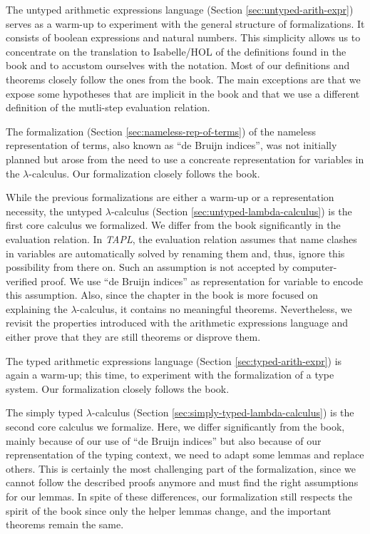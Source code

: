 The untyped arithmetic expressions language (Section \ref{sec:untyped-arith-expr}) serves as a
warm-up to experiment with the general structure of formalizations. It consists of boolean
expressions and natural numbers. This simplicity allows us to concentrate on the translation to
Isabelle/HOL of the definitions found in the book and to accustom ourselves with the notation. Most
of our definitions and theorems closely follow the ones from the book. The main exceptions are
that we expose some hypotheses that are implicit in the book and that we use a different definition
of the mutli-step evaluation relation.

The formalization (Section \ref{sec:nameless-rep-of-terms}) of the nameless representation of terms,
also known as ``de Bruijn indices'', was not initially planned but arose from the need to use a
concreate representation for variables in the $\lambda$-calculus. Our formalization closely follows
the book.

While the previous formalizations are either a warm-up or a representation necessity, the untyped
$\lambda$-calculus (Section \ref{sec:untyped-lambda-calculus}) is the first core calculus we
formalized. We differ from the book significantly in the evaluation relation. In \emph{TAPL}, the
evaluation relation assumes that name clashes in variables are automatically solved by renaming
them and, thus, ignore this possibility from there on. Such an assumption is not accepted by
computer-verified proof. We use ``de Bruijn indices'' as representation for variable to encode this
assumption. Also, since the chapter in the book is more focused on explaining the
$\lambda$-calculus, it contains no meaningful theorems. Nevertheless, we revisit the properties
introduced with the arithmetic expressions language and either prove that they are still theorems
or disprove them.

The typed arithmetic expressions language (Section \ref{sec:typed-arith-expr}) is again a warm-up;
this time, to experiment with the formalization of a type system. Our formalization closely follows
the book.

The simply typed $\lambda$-calculus (Section \ref{sec:simply-typed-lambda-calculus}) is the second
core calculus we formalize. Here, we differ significantly from the book, mainly because of our use
of ``de Bruijn indices'' but also because of our reprensentation of the typing context, we need to
adapt some lemmas and replace others. This is certainly the most challenging part of the
formalization, since we cannot follow the described proofs anymore and must find the right
assumptions for our lemmas. In spite of these differences, our formalization still respects the
spirit of the book since only the helper lemmas change, and the important theorems remain the same.

